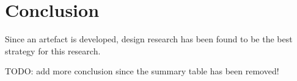 
\section{Conclusion}

Since an artefact is developed, design research has been found to be the best strategy for this research. \newline

TODO: add more conclusion since the summary table has been removed!
